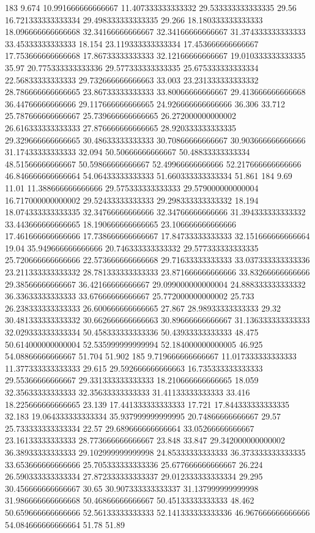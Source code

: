 183 9.674 10.991666666666667 11.407333333333332 29.533333333333335 29.56 16.721333333333334 29.498333333333335 29.266 18.180333333333333 18.096666666666668 32.34166666666667 32.34166666666667 31.374333333333333 33.45333333333333 18.154 23.119333333333334 17.453666666666667 17.753666666666668 17.86733333333333 32.12166666666667 19.010333333333335 35.97 20.775333333333336 29.577333333333335 25.675333333333334 22.56833333333333 29.732666666666663 33.003 23.231333333333332 28.786666666666665 23.86733333333333 33.80066666666667 29.413666666666668 36.44766666666666 29.117666666666665 24.926666666666666 36.306 33.712 25.787666666666667 25.739666666666665 26.272000000000002 26.616333333333333 27.876666666666665 28.920333333333335 29.329666666666665 30.48633333333333 30.70866666666667 30.903666666666666 31.17433333333333 32.094 50.50666666666667 50.48833333333334 48.51566666666667 50.59866666666667 52.49966666666666 52.217666666666666 46.846666666666664 54.06433333333333 51.660333333333334 51.861
184 9.69 11.01 11.388666666666666 29.575333333333333 29.579000000000004 16.717000000000002 29.52433333333333 29.298333333333332 18.194 18.074333333333335 32.34766666666666 32.34766666666666 31.394333333333332 33.443666666666665 18.190666666666665 23.106666666666666 17.461666666666666 17.738666666666667 17.84733333333333 32.151666666666664 19.04 35.949666666666666 20.746333333333332 29.577333333333335 25.720666666666666 22.573666666666668 29.71633333333333 33.037333333333336 23.211333333333332 28.781333333333333 23.871666666666666 33.83266666666666 29.38566666666667 36.42166666666667 29.099000000000004 24.888333333333332 36.33633333333333 33.67666666666667 25.772000000000002 25.733 26.238333333333333 26.600666666666665 27.867 28.98933333333333 29.32 30.481333333333332 30.662666666666663 30.89666666666667 31.136333333333333 32.029333333333334 50.458333333333336 50.43933333333333 48.475 50.614000000000004 52.535999999999994 52.184000000000005 46.925 54.08866666666667 51.704 51.902
185 9.719666666666667 11.017333333333333 11.377333333333333 29.615 29.592666666666663 16.735333333333333 29.55366666666667 29.331333333333333 18.210666666666665 18.059 32.35633333333333 32.35633333333333 31.41133333333333 33.416 18.225666666666665 23.139 17.441333333333333 17.721 17.844333333333335 32.183 19.064333333333334 35.937999999999995 20.74866666666667 29.57 25.733333333333334 22.57 29.689666666666664 33.05266666666667 23.16133333333333 28.773666666666667 23.848 33.847 29.342000000000002 36.38933333333333 29.102999999999998 24.85333333333333 36.373333333333335 33.653666666666666 25.705333333333336 25.677666666666667 26.224 26.590333333333334 27.872333333333337 29.012333333333334 29.295 30.456666666666667 30.65 30.907333333333337 31.137999999999998 31.986666666666668 50.46866666666667 50.45133333333333 48.462 50.659666666666666 52.56133333333333 52.141333333333336 46.967666666666666 54.084666666666664 51.78 51.89
